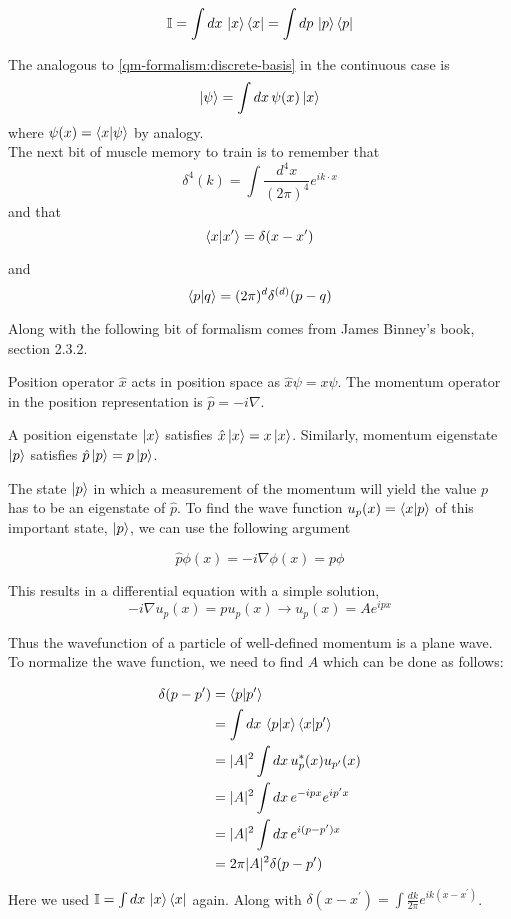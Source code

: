 $$
\mathbb{I} = \int dx \, \ket{x} \bra{x} = \int dp \, \ket{p} \bra{p}
$$


The analogous to \ref{qm-formalism:discrete-basis} in the continuous case is
$$
\ket{\psi} = \int dx\, \psi(x) \ket{x}
$$
where $\psi (x) = \braket{x | \psi}$ by analogy.
\\


The next bit of muscle memory to train is to remember that
$$
\delta^{4} (k) = \int \frac{d^4x}{(2\pi)^4} e^{ik\cdot x}
$$
and that
$$
\braket{x | x^\prime} = \delta(x - x^\prime)
$$

and
$$
\braket{p | q} = (2\pi)^d \delta^{(d)}(p - q)
$$

Along with the following bit of formalism comes from James Binney's book, section 2.3.2.

Position operator $\hat{x}$ acts in position space as $\hat{x} \psi = x\psi$.
The momentum operator in the position representation is $\hat{p} = -i\nabla$.

A position eigenstate $\ket{x}$ satisfies $\hat{x}\ket{x} = x\ket{x}$.
Similarly, momentum eigenstate $\ket{p}$ satisfies $\hat{p}\ket{p} = p\ket{p}$.

The state $\ket{p}$ in which a measurement of the momentum will yield the value $p$ has to be an eigenstate
of $\hat{p}$.
To find the wave function $u_p (x) = \braket{x | p}$ of this important state, $\ket{p}$,
we can use the following argument

$$
\hat{p} \phi(x) = -i\nabla \phi(x) = p\phi
$$

This results in a differential equation with a simple solution,
$$
-i\nabla u_p(x) = p u_p(x) \rightarrow u_p(x) = Ae^{ipx}
$$

Thus the wavefunction of a particle of well-defined momentum is a plane wave.
To normalize the wave function, we need to find $A$ which can be done as follows:

\begin{align*}
\delta(p - p^\prime) &= \braket{p | p^\prime} \\
&= \int dx \, \braket{p | x} \braket{x | p^\prime} \\
&= |A|^2 \int dx \, u_{p}^{*} (x) u_{p^\prime} (x) \\
&= |A|^2 \int dx \, e^{-ipx} e^{ip^\prime x} \\
&= |A|^2 \int dx \, e^{i(p - p^\prime) x} \\
&= 2\pi |A|^2 \delta(p - p^\prime)
\end{align*}

Here we used $\mathbb{I} = \int dx \, \ket{x}\bra{x}$ again.
Along with $\delta(x-x^\prime) = \int \frac{dk}{2\pi} e^{ik(x-x^\prime)}$.







